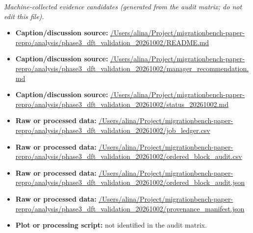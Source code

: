 \emph{Machine-collected evidence candidates (generated from the audit matrix; do not edit this file).}
\begin{itemize}[leftmargin=1.4em,noitemsep]
\item \textbf{Caption/discussion source:} \url{/Users/alina/Project/migrationbench-paper-repro/analysis/phase3_dft_validation_20261002/README.md}
\item \textbf{Caption/discussion source:} \url{/Users/alina/Project/migrationbench-paper-repro/analysis/phase3_dft_validation_20261002/manager_recommendation.md}
\item \textbf{Caption/discussion source:} \url{/Users/alina/Project/migrationbench-paper-repro/analysis/phase3_dft_validation_20261002/status_20261002.md}
\item \textbf{Raw or processed data:} \url{/Users/alina/Project/migrationbench-paper-repro/analysis/phase3_dft_validation_20261002/job_ledger.csv}
\item \textbf{Raw or processed data:} \url{/Users/alina/Project/migrationbench-paper-repro/analysis/phase3_dft_validation_20261002/ordered_block_audit.csv}
\item \textbf{Raw or processed data:} \url{/Users/alina/Project/migrationbench-paper-repro/analysis/phase3_dft_validation_20261002/ordered_block_audit.json}
\item \textbf{Raw or processed data:} \url{/Users/alina/Project/migrationbench-paper-repro/analysis/phase3_dft_validation_20261002/provenance_manifest.json}
\item \textbf{Plot or processing script:} not identified in the audit matrix.
\end{itemize}
